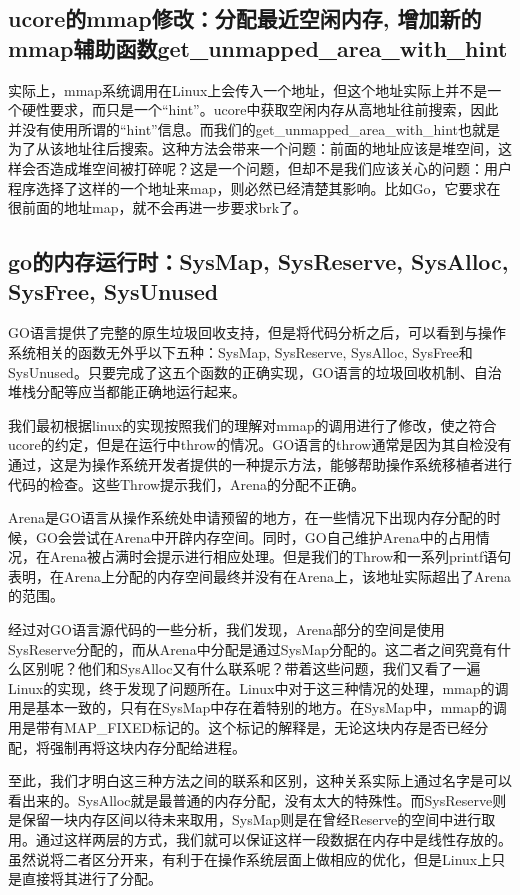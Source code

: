 \documentclass{article}
\begin{document}
\subsection{ucore的mmap修改：分配最近空闲内存, 增加新的mmap辅助函数get\_unmapped\_area\_with\_hint}
实际上，mmap系统调用在Linux上会传入一个地址，但这个地址实际上并不是一个硬性要求，而只是一个“hint”。ucore中获取空闲内存从高地址往前搜索，因此并没有使用所谓的“hint”信息。而我们的get\_unmapped\_area\_with\_hint也就是为了从该地址往后搜索。这种方法会带来一个问题：前面的地址应该是堆空间，这样会否造成堆空间被打碎呢？这是一个问题，但却不是我们应该关心的问题：用户程序选择了这样的一个地址来map，则必然已经清楚其影响。比如Go，它要求在很前面的地址map，就不会再进一步要求brk了。

\subsection{go的内存运行时：SysMap, SysReserve, SysAlloc, SysFree, SysUnused}
GO语言提供了完整的原生垃圾回收支持，但是将代码分析之后，可以看到与操作系统相关的函数无外乎以下五种：SysMap, SysReserve, SysAlloc, SysFree和SysUnused。只要完成了这五个函数的正确实现，GO语言的垃圾回收机制、自治堆栈分配等应当都能正确地运行起来。

我们最初根据linux的实现按照我们的理解对mmap的调用进行了修改，使之符合ucore的约定，但是在运行中throw的情况。GO语言的throw通常是因为其自检没有通过，这是为操作系统开发者提供的一种提示方法，能够帮助操作系统移植者进行代码的检查。这些Throw提示我们，Arena的分配不正确。

Arena是GO语言从操作系统处申请预留的地方，在一些情况下出现内存分配的时候，GO会尝试在Arena中开辟内存空间。同时，GO自己维护Arena中的占用情况，在Arena被占满时会提示进行相应处理。但是我们的Throw和一系列printf语句表明，在Arena上分配的内存空间最终并没有在Arena上，该地址实际超出了Arena的范围。

经过对GO语言源代码的一些分析，我们发现，Arena部分的空间是使用SysReserve分配的，而从Arena中分配是通过SysMap分配的。这二者之间究竟有什么区别呢？他们和SysAlloc又有什么联系呢？带着这些问题，我们又看了一遍Linux的实现，终于发现了问题所在。Linux中对于这三种情况的处理，mmap的调用是基本一致的，只有在SysMap中存在着特别的地方。在SysMap中，mmap的调用是带有MAP\_FIXED标记的。这个标记的解释是，无论这块内存是否已经分配，将强制再将这块内存分配给进程。

至此，我们才明白这三种方法之间的联系和区别，这种关系实际上通过名字是可以看出来的。SysAlloc就是最普通的内存分配，没有太大的特殊性。而SysReserve则是保留一块内存区间以待未来取用，SysMap则是在曾经Reserve的空间中进行取用。通过这样两层的方式，我们就可以保证这样一段数据在内存中是线性存放的。虽然说将二者区分开来，有利于在操作系统层面上做相应的优化，但是Linux上只是直接将其进行了分配。
\end{document}
